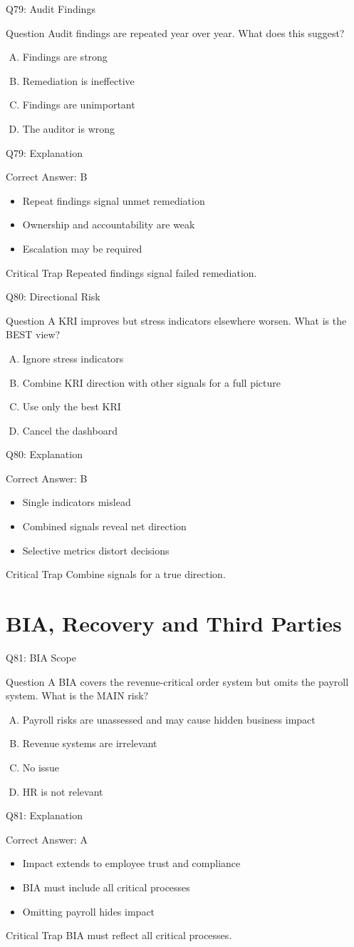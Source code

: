 \documentclass[aspectratio=169]{beamer}
\newcommand{\hq}[7]{%
	\begin{frame}{Q#1: #2}
		\begin{block}{Question}
			#3
		\end{block}
		\begin{enumerate}[(A)]
			#4
		\end{enumerate}
	\end{frame}
	\begin{frame}{Q#1: Explanation}
		\begin{block}{Correct Answer: #5}
			\begin{itemize}
				#6
			\end{itemize}
		\end{block}
		\begin{alertblock}{Critical Trap}
			#7
		\end{alertblock}
	\end{frame}
}
\begin{document}
	\hq{79}{Audit Findings}
	{Audit findings are repeated year over year. What does this suggest?}
	{\item Findings are strong
		\item Remediation is ineffective
		\item Findings are unimportant
		\item The auditor is wrong}
	{B}
	{\item Repeat findings signal unmet remediation
		\item Ownership and accountability are weak
		\item Escalation may be required}
	{Repeated findings signal failed remediation.}
	
	\hq{80}{Directional Risk}
	{A KRI improves but stress indicators elsewhere worsen. What is the BEST view?}
	{\item Ignore stress indicators
		\item Combine KRI direction with other signals for a full picture
		\item Use only the best KRI
		\item Cancel the dashboard}
	{B}
	{\item Single indicators mislead
		\item Combined signals reveal net direction
		\item Selective metrics distort decisions}
	{Combine signals for a true direction.}
	
	\section{BIA, Recovery and Third Parties}
	
	\hq{81}{BIA Scope}
	{A BIA covers the revenue-critical order system but omits the payroll system. What is the MAIN risk?}
	{\item Payroll risks are unassessed and may cause hidden business impact
		\item Revenue systems are irrelevant
		\item No issue
		\item HR is not relevant}
	{A}
	{\item Impact extends to employee trust and compliance
		\item BIA must include all critical processes
		\item Omitting payroll hides impact}
	{BIA must reflect all critical processes.}
	
\end{document}
